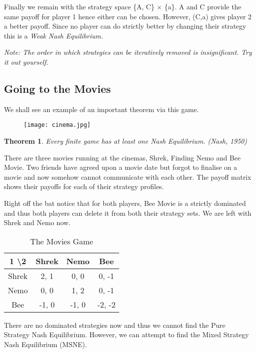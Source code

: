 \documentclass[11pt]{article}
\newtheorem{theorem}{Theorem}
\theoremstyle{definition}
\begin{document}
Finally we remain with the strategy space \{A, C\} $\times$ \{a\}. A and C provide the same payoff for player 1 hence either can be chosen. However, (C,a) gives player 2 a better payoff. Since no player can do strictly better by changing their strategy this is a \textit{Weak Nash Equilibrium.}

\textit{Note: The order in which strategies can be iteratively removed is insignificant. Try it out yourself.}

\newpage

\subsection{Going to the Movies}

We shall see an example of an important theorem via this game.

\begin{figure}[h!]
\centering
\texttt{[image: cinema.jpg]}
\label{fig:cin}
\end{figure}

\begin{theorem}
Every finite game has at least one Nash Equilibrium. (Nash, 1950)
\end{theorem}

There are three movies running at the cinemas, Shrek, Finding Nemo and Bee Movie. Two friends have agreed upon a movie date but forgot to finalise on a movie and now somehow cannot communicate with each other. The payoff matrix shows their payoffs for each of their strategy profiles.

Right off the bat notice that for both players, Bee Movie is a strictly dominated and thus both players can delete it from both their strategy sets. We are left with Shrek and Nemo now. 

\begin{table}[h!]
\centering
\begin{tabular}{|c|c|c|c|}
\hline
1 \textbackslash 2 & Shrek & Nemo & Bee \\
\hline
Shrek & 2, 1 & 0, 0 & 0, -1\\
\hline
Nemo & 0, 0 & 1, 2 & 0, -1 \\
\hline
Bee & -1, 0 & -1, 0 & -2, -2\\
\hline
\end{tabular}
\caption{The Movies Game}
\label{table:tmg}
\end{table}

There are no dominated strategies now and thus we cannot find the Pure Strategy Nash Equilibrium. However, we can attempt to find the Mixed Strategy Nash Equilibrium (MSNE).
\end{document}
